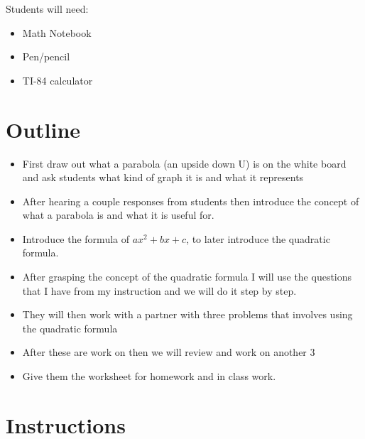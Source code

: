 Students will need:
\begin{itemize}
    \item Math Notebook
    \item Pen/pencil
    \item TI-84 calculator
\end{itemize}

\section{Outline}

\begin{itemize}
    \item First draw out what a parabola (an upside down U) is on the white board and ask students what kind of graph it is and what it represents
    \item After hearing a couple responses from students then introduce the concept of what a parabola is and what it is useful for.
    \item Introduce the formula of $ax^2 +bx+c$, to later introduce the quadratic formula.
    \item After grasping the concept of the quadratic formula I will use the  questions that I have from my instruction and we will do it step by step.
    \item They will then work with a partner with three problems that involves using the quadratic formula
    \item After these are work on then we will review and work on another 3 
    \item Give them the worksheet for homework and in class work.
\end{itemize}

\section{Instructions}

